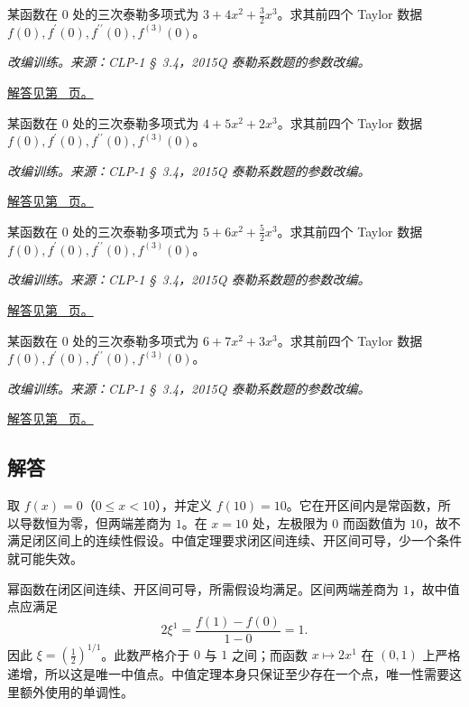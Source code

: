\documentclass[12pt,fontset=fandol]{ctexart}
\begin{document}
\begin{example}[由泰勒系数恢复导数]\label{ex:c10q22}
某函数在 $0$ 处的三次泰勒多项式为 $3+4x^2+\frac{3}{2}x^3$。求其前四个 Taylor 数据 $f(0),f^{\prime}(0),f^{\prime\prime}(0),f^{(3)}(0)$。
\par\textit{改编训练。来源：CLP-1 \S~3.4，2015Q 泰勒系数题的参数改编。}\par\hyperref[ans:c10q22]{解答见第~\pageref{ans:c10q22} 页。}
\end{example}
\begin{example}[由泰勒系数恢复导数]\label{ex:c10q23}
某函数在 $0$ 处的三次泰勒多项式为 $4+5x^2+2x^3$。求其前四个 Taylor 数据 $f(0),f^{\prime}(0),f^{\prime\prime}(0),f^{(3)}(0)$。
\par\textit{改编训练。来源：CLP-1 \S~3.4，2015Q 泰勒系数题的参数改编。}\par\hyperref[ans:c10q23]{解答见第~\pageref{ans:c10q23} 页。}
\end{example}
\begin{example}[由泰勒系数恢复导数]\label{ex:c10q24}
某函数在 $0$ 处的三次泰勒多项式为 $5+6x^2+\frac{5}{2}x^3$。求其前四个 Taylor 数据 $f(0),f^{\prime}(0),f^{\prime\prime}(0),f^{(3)}(0)$。
\par\textit{改编训练。来源：CLP-1 \S~3.4，2015Q 泰勒系数题的参数改编。}\par\hyperref[ans:c10q24]{解答见第~\pageref{ans:c10q24} 页。}
\end{example}
\begin{example}[由泰勒系数恢复导数]\label{ex:c10q25}
某函数在 $0$ 处的三次泰勒多项式为 $6+7x^2+3x^3$。求其前四个 Taylor 数据 $f(0),f^{\prime}(0),f^{\prime\prime}(0),f^{(3)}(0)$。
\par\textit{改编训练。来源：CLP-1 \S~3.4，2015Q 泰勒系数题的参数改编。}\par\hyperref[ans:c10q25]{解答见第~\pageref{ans:c10q25} 页。}
\end{example}
\subsection{解答}
\begin{solve}\label{ans:c10q1}
取 $f(x)=0$（$0\le x<10$），并定义 $f(10)=10$。它在开区间内是常函数，所以导数恒为零，但两端差商为 $1$。在 $x=10$ 处，左极限为 $0$ 而函数值为 $10$，故不满足闭区间上的连续性假设。中值定理要求闭区间连续、开区间可导，少一个条件就可能失效。
\end{solve}

\begin{solve}\label{ans:c10q2}
幂函数在闭区间连续、开区间可导，所需假设均满足。区间两端差商为 $1$，故中值点应满足
\[
2\xi^{1}=\frac{f(1)-f(0)}{1-0}=1.
\]
因此 $\xi=(\frac{1}{2})^{1/1}$。此数严格介于 $0$ 与 $1$ 之间；而函数 $x\mapsto 2x^{1}$ 在 $(0,1)$ 上严格递增，所以这是唯一中值点。中值定理本身只保证至少存在一个点，唯一性需要这里额外使用的单调性。
\end{solve}
\end{document}
